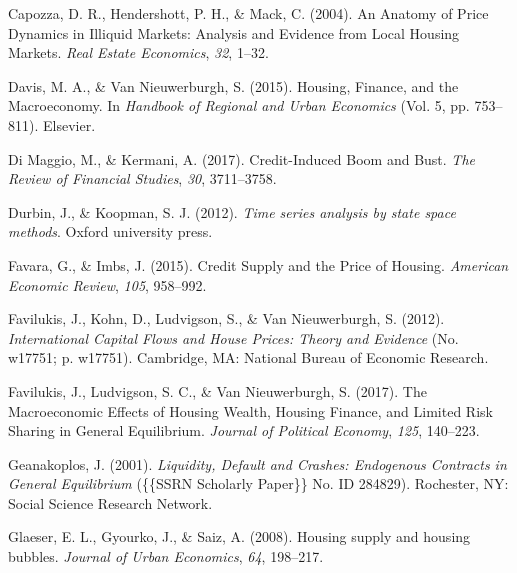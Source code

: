 \documentclass[
  12pt,
]{article}
\newlength{\cslhangindent}
\newlength{\cslentryspacingunit} %
\newenvironment{CSLReferences}[2] %
 {%
  \setlength{\parindent}{0pt}
  \ifodd #1
  \let\oldpar\par
  \def\par{\hangindent=\cslhangindent\oldpar}
  \fi
  \setlength{\parskip}{#2\cslentryspacingunit}
 }%
 {}
\begin{document}
\begin{CSLReferences}{1}{0}
\leavevmode{}%
Capozza, D. R., Hendershott, P. H., \& Mack, C. (2004). An {Anatomy} of {Price Dynamics} in {Illiquid Markets}: {Analysis} and {Evidence} from {Local Housing Markets}. \emph{Real Estate Economics}, \emph{32}, 1--32.

\leavevmode{}%
Davis, M. A., \& Van Nieuwerburgh, S. (2015). Housing, {Finance}, and the {Macroeconomy}. In \emph{Handbook of {Regional} and {Urban Economics}} (Vol. 5, pp. 753--811). {Elsevier}.

\leavevmode{}%
Di Maggio, M., \& Kermani, A. (2017). Credit-{Induced Boom} and {Bust}. \emph{The Review of Financial Studies}, \emph{30}, 3711--3758.

\leavevmode{}%
Durbin, J., \& Koopman, S. J. (2012). \emph{Time series analysis by state space methods}. {Oxford university press}.

\leavevmode{}%
Favara, G., \& Imbs, J. (2015). Credit {Supply} and the {Price} of {Housing}. \emph{American Economic Review}, \emph{105}, 958--992.

\leavevmode{}%
Favilukis, J., Kohn, D., Ludvigson, S., \& Van Nieuwerburgh, S. (2012). \emph{International {Capital Flows} and {House Prices}: {Theory} and {Evidence}} (No. w17751; p. w17751). {Cambridge, MA}: {National Bureau of Economic Research}.

\leavevmode{}%
Favilukis, J., Ludvigson, S. C., \& Van Nieuwerburgh, S. (2017). The {Macroeconomic Effects} of {Housing Wealth}, {Housing Finance}, and {Limited Risk Sharing} in {General Equilibrium}. \emph{Journal of Political Economy}, \emph{125}, 140--223.

\leavevmode{}%
Geanakoplos, J. (2001). \emph{Liquidity, {Default} and {Crashes}: {Endogenous Contracts} in {General Equilibrium}} (\{\{SSRN Scholarly Paper\}\} No. ID 284829). {Rochester, NY}: {Social Science Research Network}.

\leavevmode{}%
Glaeser, E. L., Gyourko, J., \& Saiz, A. (2008). Housing supply and housing bubbles. \emph{Journal of Urban Economics}, \emph{64}, 198--217.


\end{CSLReferences}
\end{document}
